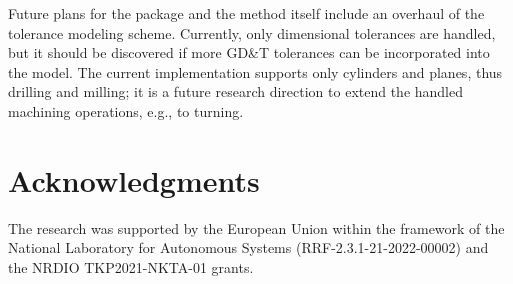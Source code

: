 \documentclass{juliacon}
\begin{document}
Future plans for the package and the method itself include an overhaul of the tolerance modeling scheme.
Currently, only dimensional tolerances are handled, but it should be discovered if more GD\&T tolerances can be incorporated into the model.
The current implementation supports only cylinders and planes, thus drilling and milling; it is a future research direction to extend the handled machining operations, e.g., to turning.

\section{Acknowledgments}
The research was supported by the European Union within the framework of the National Laboratory for Autonomous Systems (RRF-2.3.1-21-2022-00002) and the NRDIO TKP2021-NKTA-01 grants.


\end{document}
